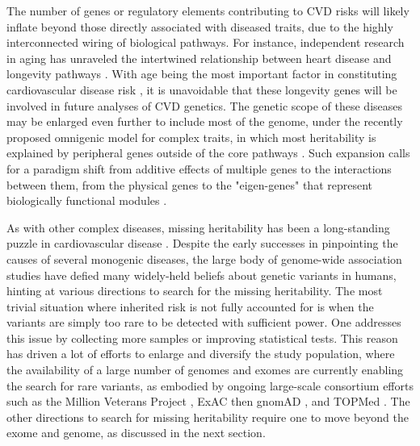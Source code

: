 \documentclass[letter]{bioinfo}
\begin{document}
The number of genes or regulatory elements contributing to CVD risks will likely inflate beyond those directly associated with diseased traits, due to the highly interconnected wiring of biological pathways.  For instance, independent research in aging has unraveled the intertwined relationship between heart disease and longevity pathways \citep{North:2012:Intersection}.  With age being the most important factor in constituting cardiovascular disease risk \citep{Steenman:2017:Cardiac}, it is unavoidable that these longevity genes will be involved in future analyses of CVD genetics. The genetic scope of these diseases may be enlarged even further to include most of the genome, under the recently proposed omnigenic model for complex traits, in which most heritability is explained by peripheral genes outside of the core pathways \citep{Boyle:2017:Expanded}. Such expansion calls for a paradigm shift from additive effects of multiple genes to the interactions between them, from the physical genes to the "eigen-genes" that represent biologically functional modules \citep{Weiss:2012:Good}.
	
As with other complex diseases, missing heritability has been a long-standing puzzle in cardiovascular disease \citep{Manolio:2009:Finding}. Despite the early successes in pinpointing the causes of several monogenic diseases, the large body of genome-wide association studies have defied many widely-held beliefs about genetic variants in humans, hinting at various directions to search for the missing heritability.  The most trivial situation where inherited risk is not fully accounted for is when the variants are simply too rare to be detected with sufficient power. One addresses this issue by collecting more samples or improving statistical tests.  This reason has driven a lot of efforts to enlarge and diversify the study population, where the availability of a large number of genomes and exomes are currently enabling the search for rare variants, as embodied by ongoing large-scale consortium efforts such as the Million Veterans Project \citep{Gaziano:2016:Million}, ExAC then gnomAD \citep{Lek:2016:Analysis}, and TOPMed \citep{NHLBI:2014:TransOmics}. The other directions to search for missing heritability require one to move beyond the exome and genome, as discussed in the next section.
	
\end{document}
